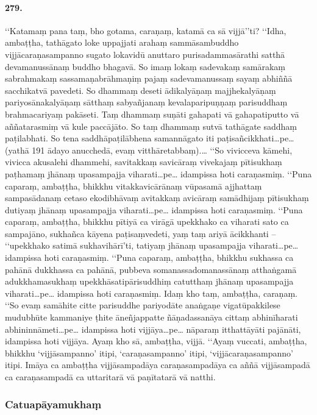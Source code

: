 \paragraph{279.} ‘‘Katamaṃ pana taṃ, bho gotama, caraṇaṃ, katamā ca sā vijjā’’ti? ‘‘Idha, ambaṭṭha, tathāgato loke uppajjati arahaṃ sammāsambuddho vijjācaraṇasampanno sugato lokavidū anuttaro purisadammasārathi satthā devamanussānaṃ buddho bhagavā. So imaṃ lokaṃ sadevakaṃ samārakaṃ sabrahmakaṃ sassamaṇabrāhmaṇiṃ pajaṃ sadevamanussaṃ sayaṃ abhiññā sacchikatvā pavedeti. So dhammaṃ deseti ādikalyāṇaṃ majjhekalyāṇaṃ pariyosānakalyāṇaṃ sātthaṃ sabyañjanaṃ kevalaparipuṇṇaṃ parisuddhaṃ brahmacariyaṃ pakāseti. Taṃ dhammaṃ suṇāti gahapati vā gahapatiputto vā aññatarasmiṃ vā kule paccājāto. So taṃ dhammaṃ sutvā tathāgate saddhaṃ paṭilabhati. So tena saddhāpaṭilābhena samannāgato iti paṭisañcikkhati…pe… (yathā 191 ādayo anucchedā, evaṃ vitthāretabbaṃ).… ‘‘So vivicceva kāmehi, vivicca akusalehi dhammehi, savitakkaṃ savicāraṃ vivekajaṃ pītisukhaṃ paṭhamaṃ jhānaṃ upasampajja viharati…pe… idampissa hoti caraṇasmiṃ. ‘‘Puna caparaṃ, ambaṭṭha, bhikkhu vitakkavicārānaṃ vūpasamā ajjhattaṃ sampasādanaṃ cetaso ekodibhāvaṃ avitakkaṃ avicāraṃ samādhijaṃ pītisukhaṃ dutiyaṃ jhānaṃ upasampajja viharati…pe… idampissa hoti caraṇasmiṃ. ‘‘Puna caparaṃ, ambaṭṭha, bhikkhu pītiyā ca virāgā upekkhako ca viharati sato ca sampajāno, sukhañca kāyena paṭisaṃvedeti, yaṃ taṃ ariyā ācikkhanti – ‘‘upekkhako satimā sukhavihārī’ti, tatiyaṃ jhānaṃ upasampajja viharati…pe… idampissa hoti caraṇasmiṃ. ‘‘Puna caparaṃ, ambaṭṭha, bhikkhu sukhassa ca pahānā dukkhassa ca pahānā, pubbeva somanassadomanassānaṃ atthaṅgamā adukkhamasukhaṃ upekkhāsatipārisuddhiṃ catutthaṃ jhānaṃ upasampajja viharati…pe… idampissa hoti caraṇasmiṃ. Idaṃ kho taṃ, ambaṭṭha, caraṇaṃ. ‘‘So evaṃ samāhite citte parisuddhe pariyodāte anaṅgaṇe vigatūpakkilese mudubhūte kammaniye ṭhite āneñjappatte ñāṇadassanāya cittaṃ abhinīharati abhininnāmeti…pe… idampissa hoti vijjāya…pe… nāparaṃ itthattāyāti pajānāti, idampissa hoti vijjāya. Ayaṃ kho sā, ambaṭṭha, vijjā. ‘‘Ayaṃ vuccati, ambaṭṭha, bhikkhu ‘vijjāsampanno’ itipi, ‘caraṇasampanno’ itipi, ‘vijjācaraṇasampanno’ itipi. Imāya ca ambaṭṭha vijjāsampadāya caraṇasampadāya ca aññā vijjāsampadā ca caraṇasampadā ca uttaritarā vā paṇītatarā vā natthi.

\subsubsection{Catuapāyamukhaṃ}

